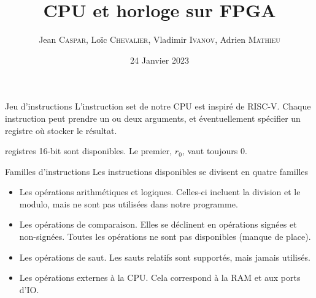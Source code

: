 \documentclass{beamer}
\title{CPU et horloge sur FPGA}
\author[%
J. \textsc{Caspar},
L. \textsc{Chevalier},
V. \textsc{Ivanov},
A. \textsc{Mathieu}%
]{
  Jean \textsc{Caspar},
  Loïc \textsc{Chevalier},
  Vladimir \textsc{Ivanov},
  Adrien \textsc{Mathieu}
}
\date{24 Janvier 2023}
\begin{document}
\begin{frame}[noframenumbering]
  \titlepage
\end{frame}

\begin{frame}[fragile]{Jeu d'instructions}
  L'instruction set de notre CPU est inspiré de RISC-V. Chaque
  instruction peut prendre un ou deux arguments, et éventuellement
  spécifier un registre où stocker le résultat.\par
   registres 16-bit sont disponibles. Le premier, \(r_0\), vaut
  toujours \(0\).\par
  \pause
\end{frame}

\begin{frame}[fragile]{Familles d'instructions}
  Les instructions disponibles se divisent en quatre familles\pause
  \begin{itemize}
  \item Les opérations arithmétiques et logiques. Celles-ci incluent
    la division et le modulo, mais ne sont pas utilisées dans notre
    programme.
    \pause
  \item Les opérations de comparaison. Elles se déclinent en opérations
    signées et non-signées. Toutes les opérations ne sont pas
    disponibles (manque de place).
    \pause
  \item Les opérations de saut. Les sauts relatifs sont supportés, mais
    jamais utilisés.
    \pause
  \item Les opérations externes à la CPU. Cela correspond à la RAM et
    aux ports d'IO.
  \end{itemize}
\end{frame}
\end{document}
